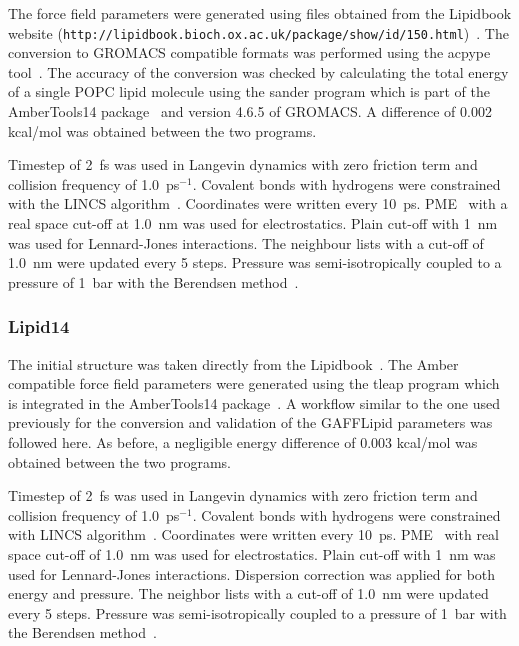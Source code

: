 \documentclass[pre,aps,floatfix,authordate1-4,twocolumn]{revtex4-1}
\begin{document}
The force field parameters were generated using files obtained from the Lipidbook website (\texttt{http://lipidbook.bioch.ox.ac.uk/package/show/id/150.html})~\cite{domanski10}. 
The conversion to GROMACS compatible formats was performed using the acpype tool~\cite{silva12}. The accuracy of the conversion was checked by calculating 
the total energy of a single POPC lipid molecule using the sander program which is part of the AmberTools14 package~\cite{ferrer13} and version 4.6.5 of GROMACS. 
A difference of 0.002 kcal/mol was obtained between the two programs.

Timestep of 2~fs was used in Langevin dynamics with zero friction term and collision frequency of 1.0~ps$^{-1}$. 
Covalent bonds with hydrogens were constrained with the LINCS algorithm~\cite{hess97,hess07}.
Coordinates were written every 10~ps. PME~\cite{darden93,essman95} with a real space cut-off at 1.0~nm was used 
for electrostatics. Plain cut-off with 1~nm was used for Lennard-Jones interactions. 
The neighbour lists with a cut-off of 1.0~nm were updated every 5 steps. 
Pressure was semi-isotropically coupled to a pressure of 1~bar with the Berendsen method~\cite{berendsen84}.

\subsubsection{Lipid14}
The initial structure was taken directly from the Lipidbook~\cite{domanski10}.
The Amber compatible force field parameters were generated using the tleap program which is integrated in the AmberTools14 package~\cite{ferrer13}. 
A workflow similar to the one used previously for the conversion and validation of the GAFFLipid parameters was followed here. 
As before, a negligible energy difference of 0.003 kcal/mol was obtained between the two programs.

Timestep of 2~fs was used in Langevin dynamics with zero friction term and collision frequency of 1.0~ps$^{-1}$. 
Covalent bonds with hydrogens were constrained with LINCS algorithm~\cite{hess97,hess07}.
Coordinates were written every 10~ps. PME~\cite{darden93,essman95} with real space cut-off of 1.0~nm was used 
for electrostatics. Plain cut-off with 1~nm was used for Lennard-Jones interactions. Dispersion correction
was applied for both energy and pressure. The neighbor lists with a cut-off of 1.0~nm were updated every 5 steps. 
Pressure was semi-isotropically coupled to a pressure of 1~bar with the Berendsen method~\cite{berendsen84}.
\end{document}
